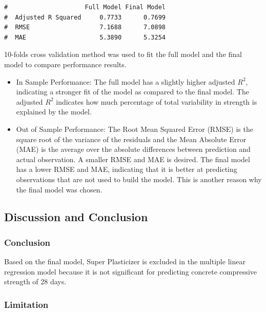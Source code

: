 \documentclass[letterpaper,9pt,twocolumn,twoside,]{pinp}
\providecommand{\tightlist}{%
  \setlength{\itemsep}{0pt}\setlength{\parskip}{0pt}}
\begin{document}
\begin{ShadedResult}
\begin{verbatim}
#                     Full Model Final Model
#  Adjusted R Squared     0.7733      0.7699
#  RMSE                   7.1688      7.0898
#  MAE                    5.3890      5.3254
\end{verbatim}
\end{ShadedResult}

10-folds cross validation method was used to fit the full model and the
final model to compare performance results.

\begin{itemize}
\tightlist
\item
  In Sample Performance: The full model has a slightly higher adjusted
  \(R^2\), indicating a stronger fit of the model as compared to the
  final model. The adjusted \(R^2\) indicates how much percentage of
  total variability in strength is explained by the model.
\item
  Out of Sample Performance: The Root Mean Squared Error (RMSE) is the
  square root of the variance of the residuals and the Mean Absolute
  Error (MAE) is the average over the absolute differences between
  prediction and actual observation. A smaller RMSE and MAE is desired.
  The final model has a lower RMSE and MAE, indicating that it is better
  at predicting observations that are not used to build the model. This
  is another reason why the final model was chosen.
\end{itemize}

\hypertarget{discussion-and-conclusion}{%
\subsection{Discussion and Conclusion}\label{discussion-and-conclusion}}

\hypertarget{conclusion}{%
\subsubsection{Conclusion}\label{conclusion}}

Based on the final model, Super Plasticizer is excluded in the multiple
linear regression model because it is not significant for predicting
concrete compressive strength of 28 days.

\hypertarget{limitation}{%
\subsubsection{Limitation}\label{limitation}}
\end{document}
